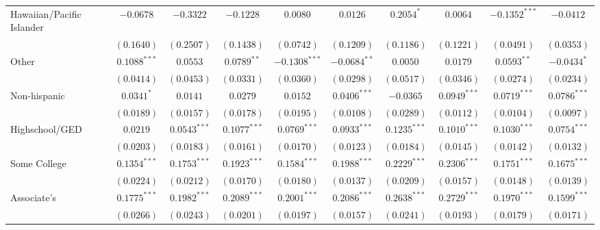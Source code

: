 \begin{table}
\begin{center}
\begin{tabular}{l c c c c c c c c c}
Hawaiian/Pacific Islander      & $-0.0678$       & $-0.3322$       & $-0.1228$       & $0.0080$        & $0.0126$        & $0.2054^{*}$    & $0.0064$        & $-0.1352^{***}$ & $-0.0412$       \\
                               & $(0.1640)$      & $(0.2507)$      & $(0.1438)$      & $(0.0742)$      & $(0.1209)$      & $(0.1186)$      & $(0.1221)$      & $(0.0491)$      & $(0.0353)$      \\
Other                          & $0.1088^{***}$  & $0.0553$        & $0.0789^{**}$   & $-0.1308^{***}$ & $-0.0684^{**}$  & $0.0050$        & $0.0179$        & $0.0593^{**}$   & $-0.0434^{*}$   \\
                               & $(0.0414)$      & $(0.0453)$      & $(0.0331)$      & $(0.0360)$      & $(0.0298)$      & $(0.0517)$      & $(0.0346)$      & $(0.0274)$      & $(0.0234)$      \\
Non-hispanic                   & $0.0341^{*}$    & $0.0141$        & $0.0279$        & $0.0152$        & $0.0406^{***}$  & $-0.0365$       & $0.0949^{***}$  & $0.0719^{***}$  & $0.0786^{***}$  \\
                               & $(0.0189)$      & $(0.0157)$      & $(0.0178)$      & $(0.0195)$      & $(0.0108)$      & $(0.0289)$      & $(0.0112)$      & $(0.0104)$      & $(0.0097)$      \\
Highschool/GED                 & $0.0219$        & $0.0543^{***}$  & $0.1077^{***}$  & $0.0769^{***}$  & $0.0933^{***}$  & $0.1235^{***}$  & $0.1010^{***}$  & $0.1030^{***}$  & $0.0754^{***}$  \\
                               & $(0.0203)$      & $(0.0183)$      & $(0.0161)$      & $(0.0170)$      & $(0.0123)$      & $(0.0184)$      & $(0.0145)$      & $(0.0142)$      & $(0.0132)$      \\
Some College                   & $0.1354^{***}$  & $0.1753^{***}$  & $0.1923^{***}$  & $0.1584^{***}$  & $0.1988^{***}$  & $0.2229^{***}$  & $0.2306^{***}$  & $0.1751^{***}$  & $0.1675^{***}$  \\
                               & $(0.0224)$      & $(0.0212)$      & $(0.0170)$      & $(0.0180)$      & $(0.0137)$      & $(0.0209)$      & $(0.0157)$      & $(0.0148)$      & $(0.0139)$      \\
Associate's                    & $0.1775^{***}$  & $0.1982^{***}$  & $0.2089^{***}$  & $0.2001^{***}$  & $0.2086^{***}$  & $0.2638^{***}$  & $0.2729^{***}$  & $0.1970^{***}$  & $0.1599^{***}$  \\
                               & $(0.0266)$      & $(0.0243)$      & $(0.0201)$      & $(0.0197)$      & $(0.0157)$      & $(0.0241)$      & $(0.0193)$      & $(0.0179)$      & $(0.0171)$      \\

\end{tabular}
\end{center}
\end{table}
